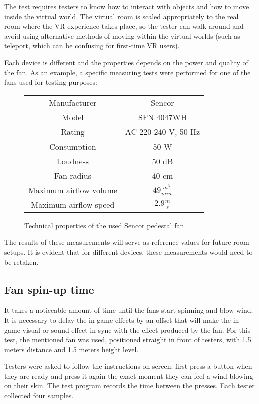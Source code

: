 The test requires testers to know how to interact with objects and how to move
inside the virtual world. The virtual room is scaled appropriately to the
real room where the VR experience takes place, so the tester can walk around
and avoid using alternative methods of moving within the virtual worlds
(such as teleport, which can be confusing for first-time VR users).


Each device is different and the properties depends on the power and quality of the fan.
As an example, a specific measuring tests were performed for one of the fans
used for testing purposes:

\begin{figure}
\begin{center}
\begin{tabular}{|c|c|}
\hline
Manufacturer & Sencor \\ 
Model & SFN 4047WH \\ 
Rating & AC 220-240 V, 50 Hz \\ 
Consumption & 50 W \\ 
Loudness & 50 dB \\ 
Fan radius & 40 cm \\ 
Maximum airflow volume & $ 49 \frac{m^3}{min} $ \\ 
Maximum airflow speed & $ 2.9 \frac{m}{s} $ \\ 
\hline
\end{tabular}
\end{center}
\caption{Technical properties of the used Sencor pedestal fan \cite{sencormanual}}
\end{figure}

The results of these measurements will serve as reference values for future
room setups. It is evident that for different devices, these measurements
would need to be retaken.


\hypertarget{x-fan-spin-up-time}{\subsection{Fan spin-up time}}
It takes a noticeable amount of time until the fans start spinning and
blow wind. It is necessary to delay the in-game effects by an offset that
will make the in-game visual or sound effect in sync with the effect
produced by the fan.
For this test, the mentioned fan was used, positioned straight in front of
testers, with 1.5 meters distance and 1.5 meters height level.


Testers were asked to follow the instructions on-screen: first press a button
when they are ready and press it again the exact moment they can feel a wind
blowing on their skin. The test program records the time between the presses.
Each tester collected four samples.


